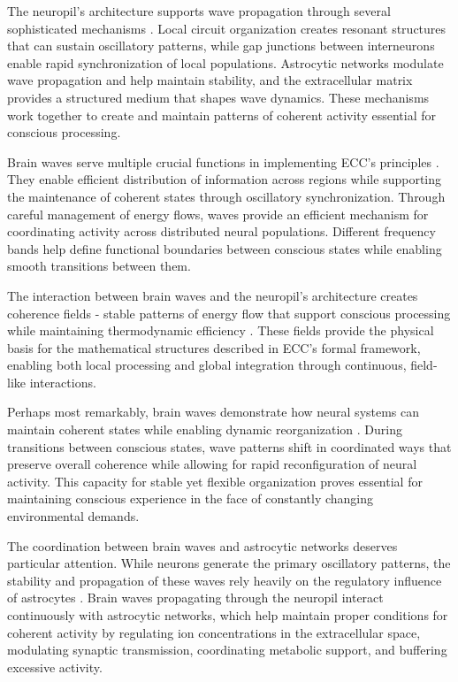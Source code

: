 \begin{refsection}
The neuropil's architecture supports wave propagation through several sophisticated mechanisms \cite{Buzsaki2006}. Local circuit organization creates resonant structures that can sustain oscillatory patterns, while gap junctions between interneurons enable rapid synchronization of local populations. Astrocytic networks modulate wave propagation and help maintain stability, and the extracellular matrix provides a structured medium that shapes wave dynamics. These mechanisms work together to create and maintain patterns of coherent activity essential for conscious processing.

Brain waves serve multiple crucial functions in implementing ECC's principles \cite{Varela2001}. They enable efficient distribution of information across regions while supporting the maintenance of coherent states through oscillatory synchronization. Through careful management of energy flows, waves provide an efficient mechanism for coordinating activity across distributed neural populations. Different frequency bands help define functional boundaries between conscious states while enabling smooth transitions between them.

The interaction between brain waves and the neuropil's architecture creates coherence fields - stable patterns of energy flow that support conscious processing while maintaining thermodynamic efficiency \cite{Fries2015}. These fields provide the physical basis for the mathematical structures described in ECC's formal framework, enabling both local processing and global integration through continuous, field-like interactions.

Perhaps most remarkably, brain waves demonstrate how neural systems can maintain coherent states while enabling dynamic reorganization \cite{Engel2001}. During transitions between conscious states, wave patterns shift in coordinated ways that preserve overall coherence while allowing for rapid reconfiguration of neural activity. This capacity for stable yet flexible organization proves essential for maintaining conscious experience in the face of constantly changing environmental demands.

The coordination between brain waves and astrocytic networks deserves particular attention. While neurons generate the primary oscillatory patterns, the stability and propagation of these waves rely heavily on the regulatory influence of astrocytes \cite{Ward2003}. Brain waves propagating through the neuropil interact continuously with astrocytic networks, which help maintain proper conditions for coherent activity by regulating ion concentrations in the extracellular space, modulating synaptic transmission, coordinating metabolic support, and buffering excessive activity.


\end{refsection}

